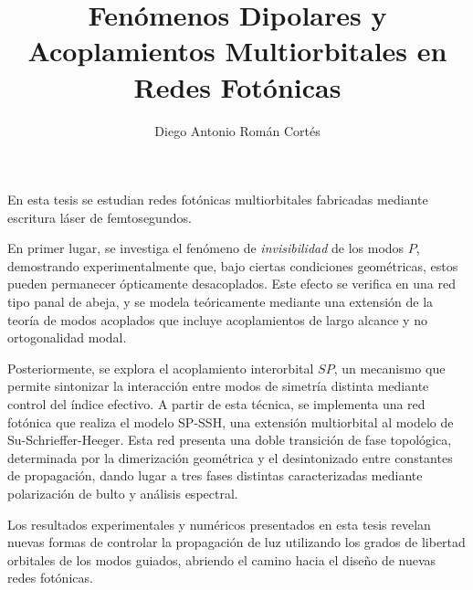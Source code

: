 \documentclass[hyphens]{umemoria}
\author{Diego Antonio Román Cortés}
\title{Fenómenos Dipolares y Acoplamientos Multiorbitales en Redes Fotónicas}
\begin{document}
\frontmatter
\maketitle

\begin{resumen}
	\noindent En esta tesis se estudian redes fotónicas multiorbitales fabricadas mediante escritura láser de femtosegundos. 
	
	En primer lugar, se investiga el fenómeno de \textit{invisibilidad} de los modos \( P \), demostrando experimentalmente que, bajo ciertas condiciones geométricas, estos pueden permanecer ópticamente desacoplados. Este efecto se verifica en una red tipo panal de abeja, y se modela teóricamente mediante una extensión de la teoría de modos acoplados que incluye acoplamientos de largo alcance y no ortogonalidad modal.
	 
	 Posteriormente, se explora el acoplamiento interorbital \( SP \), un mecanismo que permite sintonizar la interacción entre modos de simetría distinta mediante control del índice efectivo. A partir de esta técnica, se implementa una red fotónica que realiza el modelo SP-SSH, una extensión multiorbital al modelo de Su-Schrieffer-Heeger. Esta red presenta una doble transición de fase topológica, determinada por la dimerización geométrica y el desintonizado entre constantes de propagación, dando lugar a tres fases distintas caracterizadas mediante polarización de bulto y análisis espectral.
	  
	Los resultados experimentales y numéricos presentados en esta tesis revelan nuevas formas de controlar la propagación de luz utilizando los grados de libertad orbitales de los modos guiados, abriendo el camino hacia el diseño de nuevas redes fotónicas.
\end{resumen}

\end{document}
